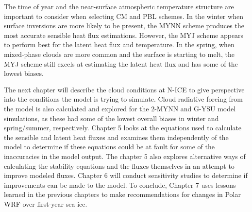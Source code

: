 The time of year and the near-surface atmospheric temperature structure are important to consider when selecting CM and PBL schemes. In the winter when surface inversions are more likely to be present, the MYNN scheme produces the most accurate sensible heat flux estimations. However, the MYJ scheme appears to perform best for the latent heat flux and temperature. In the spring, when mixed-phase clouds are more common and the surface is starting to melt, the MYJ scheme still excels at estimating the latent heat flux and has some of the lowest biases. 

The next chapter will describe the cloud conditions at N-ICE to give perspective into the conditions the model is trying to simulate. Cloud radiative forcing from the model is also calculated and explored for the 2-MYNN and G-YSU model simulations, as these had some of the lowest overall biases in winter and spring/summer, respectively. Chapter 5 looks at the equations used to calculate the sensible and latent heat fluxes and examines them independently of the model to determine if these equations could be at fault for some of the inaccuracies in the model output. The chapter 5 also explores alternative ways of calculating the stability equations and the fluxes themselves in an attempt to improve modeled fluxes. Chapter 6 will conduct sensitivity studies to determine if improvements can be made to the model. To conclude, Chapter 7 uses lessons learned in the previous chapters to make recommendations for changes in Polar WRF over first-year sea ice. 